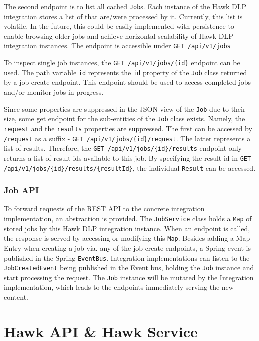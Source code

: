 The second endpoint is to list all cached \texttt{Job}s. Each instance of the Hawk DLP integration stores a list of that are/were processed by it. Currently, this list is volatile. In the future, this could be easily implemented with persistence to enable browsing older jobs and achieve horizontal scalability of Hawk DLP integration instances. The endpoint is accessible under \texttt{GET /api/v1/jobs}

To inspect single job instances, the \texttt{GET /api/v1/jobs/\{id\}} endpoint can be used. The path variable \texttt{id} represents the \texttt{id} property of the \texttt{Job} class returned by a job create endpoint. This endpoint should be used to access completed jobs and/or monitor jobs in progress.

Since some properties are suppressed in the JSON view of the \texttt{Job} due to their size, some get endpoint for the sub-entities of the \texttt{Job} class exists.
Namely, the \texttt{request} and the \texttt{results} properties are suppressed. The first can be accessed by \texttt{/request} as a suffix - \texttt{GET /api/v1/jobs/\{id\}/request}. The latter represents a list of results. Therefore, the \texttt{GET /api/v1/jobs/\{id\}/results} endpoint only returns a list of result ids available to this job. By specifying the result id in \texttt{GET /api/v1/jobs/\{id\}/results/\{resultId\}}, the individual \texttt{Result} can be accessed.

\subsubsection{Job API}

To forward requests of the REST API to the concrete integration implementation, an abstraction is provided. The \texttt{JobService} class holds a \texttt{Map} of stored jobs by this Hawk DLP integration instance. When an endpoint is called, the response is served by accessing or modifying this \texttt{Map}. Besides adding a Map-Entry when creating a job via. any of the job create endpoints, a Spring event is published in the Spring \texttt{EventBus}. Integration implementations can listen to the \texttt{JobCreatedEvent} being published in the Event bus, holding the \texttt{Job} instance and start processing the request. The \texttt{Job} instance will be mutated by the Integration implementation, which leads to the endpoints immediately serving the new content.

\section{Hawk API \& Hawk Service}

